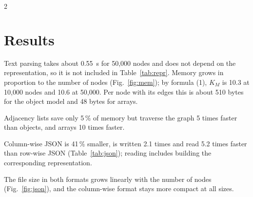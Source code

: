 \documentclass[a4paper,10pt,twoside]{article}
\begin{document}
\begin{multicols}{2}
\section{Results}
Text parsing takes about 0.55~s for 50,000 nodes and does not depend on the representation, so it is not included in Table~\ref{tab:repr}. Memory grows in proportion to the number of nodes (Fig.~\ref{fig:mem}); by formula (1), $K_M$ is 10.3 at 10,000 nodes and 10.6 at 50,000. Per node with its edges this is about 510 bytes for the object model and 48 bytes for arrays.


Adjacency lists save only 5\,\% of memory but traverse the graph 5 times faster than objects, and arrays 10 times faster.


Column-wise JSON is 41\,\% smaller, is written 2.1 times and read 5.2 times faster than row-wise JSON (Table~\ref{tab:json}); reading includes building the corresponding representation.


The file size in both formats grows linearly with the number of nodes (Fig.~\ref{fig:json}), and the column-wise format stays more compact at all sizes.



\end{multicols}
\end{document}

